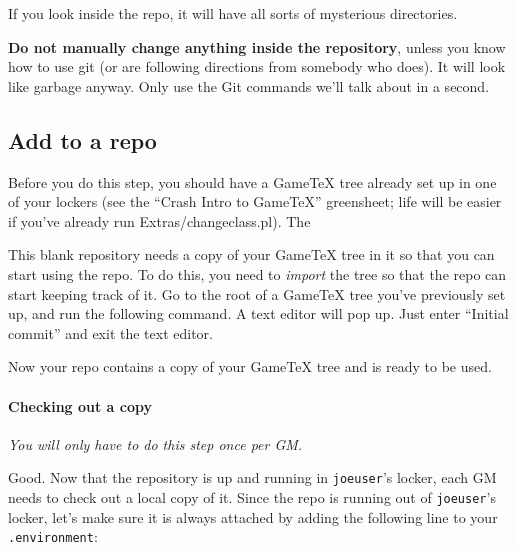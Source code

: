 \documentclass[green]{testgame}
\begin{document}

If you look inside the repo, it will have all sorts of mysterious directories.


\textbf{Do not manually change anything inside the repository}, unless you know how to use git (or are following directions from somebody who does). It will look like garbage anyway. Only use the Git commands we'll talk about in a second.

\subsection{Add \gametex{} to a repo}

Before you do this step, you should have a GameTeX tree already set up
in one of your lockers (see the ``Crash Intro to GameTeX'' greensheet;
life will be easier if you've already run Extras/changeclass.pl). The

This blank repository needs a copy of your GameTeX tree in it so that
you can start using the repo. To do this, you need to \emph{import} the
tree so that the repo can start keeping track of it. Go to the root of
a GameTeX tree you've previously set up, and run the following
command. A text editor will pop up. Just enter ``Initial commit'' and
exit the text editor.


Now your repo contains a copy of your GameTeX tree and is ready to be
used.

\paragraph*{Checking out a copy}

\emph{You will only have to do this step once per GM.}

Good. Now that the repository is up and running in {\tt joeuser}'s
locker, each GM needs to check out a local copy of it. Since the repo
is running out of {\tt joeuser}'s locker, let's make sure it is always
attached by adding the following line to your {\tt .environment}:
\end{document}
